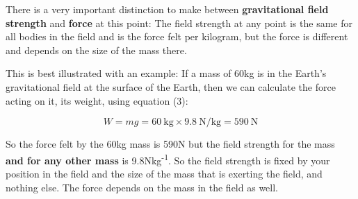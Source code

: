 \documentclass[main.tex]{subfiles}
\begin{document}
There is a very important distinction to make between
\textbf{gravitational field strength} and \textbf{force} at this point:
The field strength at any point is the same for all bodies in the field
and is the force felt per kilogram, but the force is different and
depends on the size of the mass there.

This is best illustrated with an example: If a mass of 60kg is in the
Earth's gravitational field at the surface of the Earth, then we can
calculate the force acting on it, its weight, using equation (3):

\[W = mg = \SI{60}{\kg} \times \SI{9.8}{\N\per\kg} = \SI{590}{\N}\]

So the force felt by the 60kg mass is 590N but the field strength for
the mass \textbf{and for any other mass} is 9.8Nkg\textsuperscript{-1}.
So the field strength is fixed by your position in the field and the
size of the mass that is exerting the field, and nothing else. The force
depends on the mass in the field as well.
\end{document}
